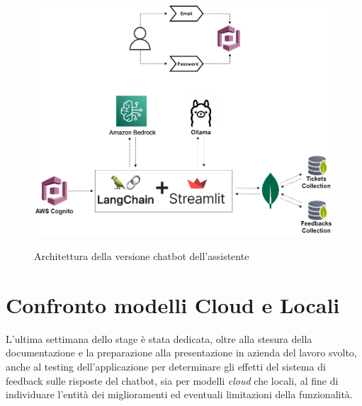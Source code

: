 \begin{figure}[H]
    \centering
    \includegraphics[alt={Architettura della versione chatbot dell'assistente}, width=1\columnwidth]{img/ChatbotArch.png}
    \caption{Architettura della versione chatbot dell'assistente}
    \label{fig:chatbot_ai_architecture}
\end{figure}

\newpage
\section{Confronto modelli Cloud e Locali}
L'ultima settimana dello stage è stata dedicata, oltre alla stesura della documentazione e la preparazione alla presentazione in azienda del lavoro svolto, anche al testing 
dell'applicazione per determinare gli effetti del sistema di feedback sulle risposte del chatbot, sia per modelli \textit{cloud} che locali, al fine di individuare l'entità dei 
miglioramenti ed eventuali limitazioni della funzionalità.

